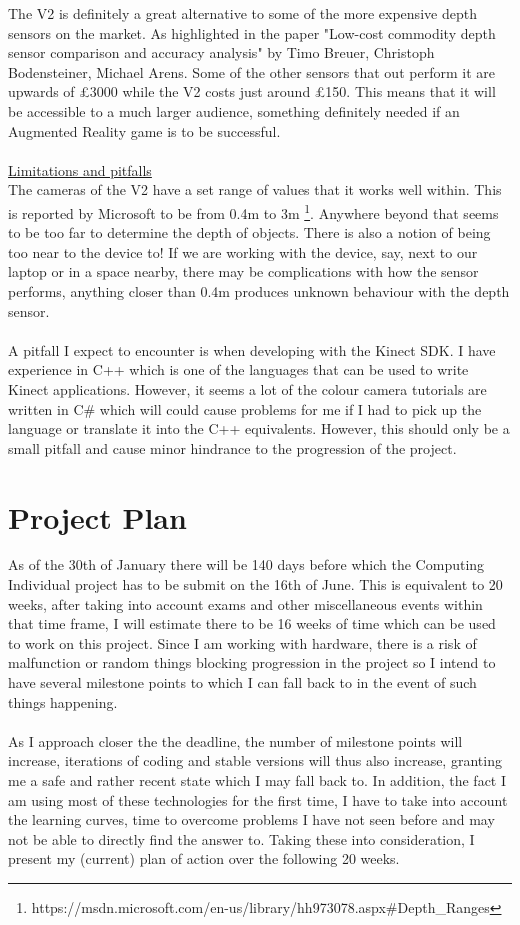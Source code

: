 \documentclass[11pt]{report}
\begin{document}
The V2 is definitely a great alternative to some of the more expensive depth 
sensors on the market. As highlighted in the paper
"Low-cost commodity depth sensor comparison and accuracy analysis" by
Timo Breuer, Christoph Bodensteiner, Michael Arens. Some of the other sensors
that out perform it are upwards of £3000 while the V2 costs just around £150.
This means that it will be accessible to a much larger audience, something
definitely needed if an Augmented Reality game is to be successful.
\\ \\
\underline{Limitations and pitfalls}\\
The cameras of the V2 have a set range of values that it works well within.
This is reported by Microsoft to be from 0.4m to 3m
\footnote{https://msdn.microsoft.com/en-us/library/hh973078.aspx\#Depth\_Ranges}.
Anywhere beyond that seems to be too
far to determine the depth of objects. There is also a notion of being too near
to the device to! If we are working with the device, say, next to our laptop or
in a space nearby, there may be complications with how the sensor performs, 
anything closer than 0.4m produces unknown behaviour with the depth sensor.
\\ \\
A pitfall I expect to encounter is when developing with the Kinect SDK. I have
experience in C++ which is one of the languages that can be used to write Kinect 
applications. However, it seems a lot of the colour camera tutorials are written
in C\# which will could cause problems for me if I had to pick up the language 
or translate it into the C++ equivalents. However, this should only be a small
pitfall and cause minor hindrance to the progression of the project.

\newpage
\section*{Project Plan}
As of the 30th of January there will be 140 days before which the Computing 
Individual project has to be submit on the 16th of June. This is equivalent
to 20 weeks, after taking into account exams and other miscellaneous events 
within that time frame, I will estimate there to be 16 weeks of time which can
be used to work on this project. Since I am working with hardware, there is
a risk of malfunction or random things blocking progression in the project
so I intend to have several milestone points to which I can fall back to in
the event of such things happening. 
\\ \\
As I approach closer the the deadline, the
number of milestone points will increase, iterations of coding and stable 
versions will thus also increase, granting me a safe and rather recent state
which I may fall back to. In addition, the fact I am using most of these
technologies for the first time, I have to take into account the learning curves,
time to overcome problems I have not seen before and may not be able to 
directly find the answer to. Taking these into consideration, I present my
(current) plan of action over the following 20 weeks. 
\end{document}
